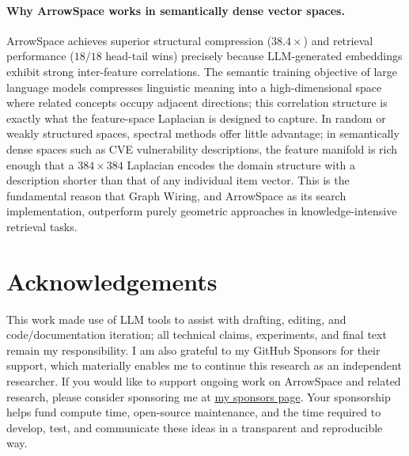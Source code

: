 \documentclass[12pt,a4paper]{article}
\theoremstyle{plain}
\theoremstyle{definition}
\theoremstyle{remark}
\newcommand{\1}{\mathbf{1}}
\begin{document}
	\paragraph{Why ArrowSpace works in semantically dense vector spaces.}
	ArrowSpace achieves superior structural compression ($38.4\times$) and
	retrieval performance ($18/18$ head-tail wins) precisely because
	LLM-generated embeddings exhibit strong inter-feature correlations.
	The semantic training objective of large language models compresses
	linguistic meaning into a high-dimensional space where related concepts
	occupy adjacent directions; this correlation structure is exactly what
	the feature-space Laplacian is designed to capture.
	In random or weakly structured spaces, spectral methods offer little
	advantage; in semantically dense spaces such as CVE vulnerability
	descriptions, the feature manifold is rich enough that a $384\times 384$
	Laplacian encodes the domain structure with a description shorter than
	that of any individual item vector.
	This is the fundamental reason that Graph Wiring, and ArrowSpace as its
	search implementation, outperform purely geometric approaches in
	knowledge-intensive retrieval tasks.
	
	\section{Acknowledgements}
	This work made use of LLM tools to assist with drafting, editing, and code/documentation iteration; all technical claims, experiments, and final text remain my responsibility. I am also grateful to my GitHub Sponsors for their support, which materially enables me to continue this research as an independent researcher. If you would like to support ongoing work on ArrowSpace and related research, please consider sponsoring me at \href{https://github.com/sponsors/tuned-org-uk}{my sponsors page}. Your sponsorship helps fund compute time, open-source maintenance, and the time required to
	develop, test, and communicate these ideas in a transparent and reproducible way.
	
\end{document}
